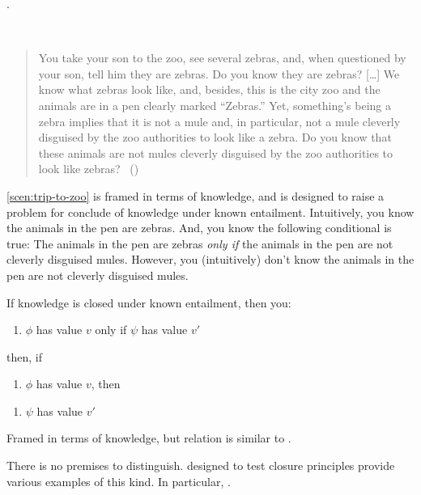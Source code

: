 \begin{note}
  \citeauthor{Dretske:1970to}.
  \begin{scenario}\mbox{ }
    \label{scen:trip-to-zoo}
    \vspace{-\baselineskip}
    \begin{quote}
      You take your son to the zoo, see several zebras, and, when questioned by your son, tell him they are zebras.
      Do you know they are zebras?
      [\dots]
      We know what zebras look like, and, besides, this is the city zoo and the animals are in a pen clearly marked ``Zebras.''
      Yet, something's being a zebra implies that it is not a mule and, in particular, not a mule cleverly disguised by the zoo authorities to look like a zebra.
      Do you know that these animals are not mules cleverly disguised by the zoo authorities to look like zebras?\newline
      \mbox{ }\hfill\mbox{(\citeyear[1015--1016]{Dretske:1970to})}
    \end{quote}
    \vspace{-\baselineskip}
  \end{scenario}

  \autoref{scen:trip-to-zoo} is framed in terms of knowledge, and is designed to raise a problem for conclude of knowledge under known entailment.
  Intuitively, you know the animals in the pen are zebras.
  And, you know the following conditional is true:
  The animals in the pen are zebras \emph{only if} the animals in the pen are not cleverly disguised mules.
  However, you (intuitively) don't know the animals in the pen are not cleverly disguised mules.

  If knowledge is closed under known entailment, then you:
  \begin{enumerate}
  \item \(\phi\) has value \(v\) only if \(\psi\) has value \(v'\)
  \end{enumerate}
  then, if
  \begin{enumerate}
  \item
    \(\phi\) has value \(v\), then
  \end{enumerate}
  \begin{enumerate}
  \item \(\psi\) has value \(v'\)
  \end{enumerate}

  Framed in terms of knowledge, but relation is similar to \curb{}.

  There is no premises to distinguish.
   designed to test closure principles provide various examples of this kind.
  In particular, \citeauthor{Wright:2011wn}.
\end{note}

